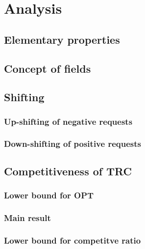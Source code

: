 \section{Analysis}

\subsection{Elementary properties}

\subsection{Concept of fields}

\subsection{Shifting}
\subsubsection{Up-shifting of negative requests}
\subsubsection{Down-shifting of positive requests}

\subsection{Competitiveness of TRC}
\subsubsection{Lower bound for OPT}
\subsubsection{Main result}
\subsubsection{Lower bound for competitve ratio}